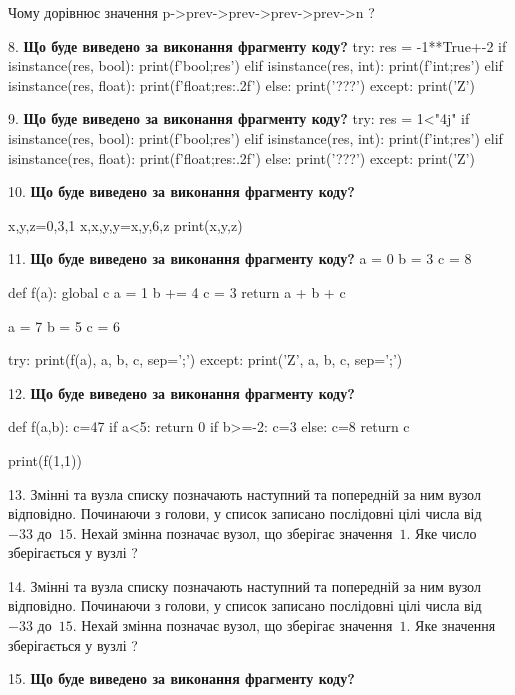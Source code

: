 \documentclass[11pt]{article}
\begin{document}
Чому дорівнює значення p->prev->prev->prev->prev->n ?\par\vspace{5mm}
8. \textbf{Що буде виведено за виконання фрагменту коду?}
try:
    res = -1**True+-2
    if isinstance(res, bool):
        print(f'bool;{res}')
    elif isinstance(res, int):
        print(f'int;{res}')
    elif isinstance(res, float):
        print(f'float;{res:.2f}')
    else:
        print('???')
except:
    print('Z')
\par\vspace{5mm}
9. \textbf{Що буде виведено за виконання фрагменту коду?}
try:
    res = 1<"4j"
    if isinstance(res, bool):
        print(f'bool;{res}')
    elif isinstance(res, int):
        print(f'int;{res}')
    elif isinstance(res, float):
        print(f'float;{res:.2f}')
    else:
        print('???')
except:
    print('Z')
\par\vspace{5mm}
10. \textbf{Що буде виведено за виконання фрагменту коду?}

x,y,z=0,3,1
x,x,y,y=x,y,6,z
print(x,y,z)
\par\vspace{5mm}
11. \textbf{Що буде виведено за виконання фрагменту коду?}
a = 0
b = 3
c = 8

def f(a):
global c    a = 1
    b += 4
    c = 3
    return a + b + c

a = 7
b = 5
c = 6

try:
    print(f(a), a, b, c, sep=';')
except:
    print('Z', a, b, c, sep=';')
\par\vspace{5mm}
12. \textbf{Що буде виведено за виконання фрагменту коду?}

def f(a,b):
    c=47
    if a<5:
        return 0
    if b>=-2:
         c=3
    else: 
        c=8
    return c

print(f(1,1))
\par\vspace{5mm}
13. 
Змінні  та  вузла списку позначають наступний та попередній за ним вузол відповідно. Починаючи з голови, у список записано послідовні цілі числа від~$-33$ до~$15$. Нехай змінна  позначає вузол, що зберігає значення~$1$.
Яке число зберігається у вузлі  ?
\par\vspace{5mm}
14. 
Змінні  та  вузла списку позначають наступний та попередній за ним вузол відповідно. Починаючи з голови, у список записано послідовні цілі числа від~$-33$ до~$15$. Нехай змінна  позначає вузол, що зберігає значення~$1$.
Яке значення зберігається у вузлі  ?
\par\vspace{5mm}
15. \textbf{Що буде виведено за виконання фрагменту коду?}
\end{document}
